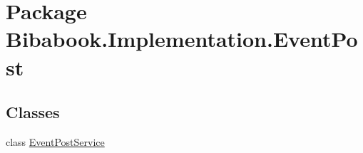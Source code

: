 \hypertarget{namespace_bibabook_1_1_implementation_1_1_event_post}{}\section{Package Bibabook.\+Implementation.\+Event\+Post}
\label{namespace_bibabook_1_1_implementation_1_1_event_post}
\subsection*{Classes}
\begin{DoxyCompactItemize}
\item 
class \hyperlink{class_bibabook_1_1_implementation_1_1_event_post_1_1_event_post_service}{Event\+Post\+Service}
\end{DoxyCompactItemize}
